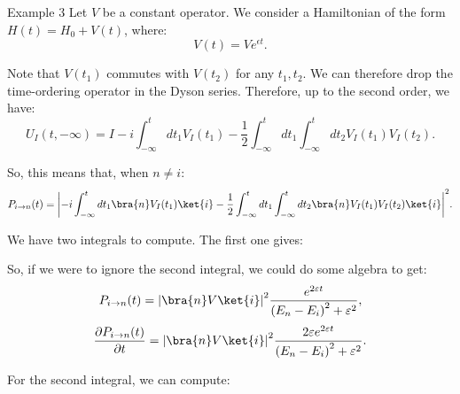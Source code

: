 \documentclass[a4paper]{article}
\begin{document}
\begin{parag}{Example 3}
    Let $V$ be a constant operator. We consider a Hamiltonian of the form $H\left(t\right) = H_0 + V\left(t\right)$, where:
    \[V\left(t\right) = V e^{\epsilon t}.\]
   
    Note that $V\left(t_1\right)$ commutes with $V\left(t_2\right)$ for any $t_1, t_2$. We can therefore drop the time-ordering operator in the Dyson series. Therefore, up to the second order, we have: 
    \[U_I\left(t, -\infty\right) = I - i \int_{-\infty}^{t} dt_1 V_I\left(t_1\right) - \frac{1}{2} \int_{-\infty}^{t} dt_1 \int_{-\infty}^{t} dt_2 V_I\left(t_1\right) V_I\left(t_2\right).\]

    So, this means that, when $n \neq i$:  
    \[P_{i \to n}\left(t\right) = \left|-i \int_{-\infty}^{t} dt_1 \bra{n} V_I\left(t_1\right) \ket{i} - \frac{1}{2} \int_{-\infty}^{t} dt_1 \int_{-\infty}^{t} dt_2 \bra{n} V_I\left(t_1\right) V_I\left(t_2\right) \ket{i}\right|^2.\]

    We have two integrals to compute. The first one gives: 
    
    
    So, if we were to ignore the second integral, we could do some algebra to get: 
    \[P_{i \to n}\left(t\right) = \left|\bra{n} V \ket{i}\right|^2 \frac{e^{2 \epsilon t}}{\left(E_n - E_i\right)^2 + \epsilon^2},\] 
    \[\frac{\partial P_{i \to n}\left(t\right)}{\partial t} = \left|\bra{n} V \ket{i}\right|^2 \frac{2 \epsilon e^{2 \epsilon t}}{\left(E_n - E_i\right)^2 + \epsilon^2}.\]
    
    For the second integral, we can compute: 
    

\end{parag}
\end{document}
